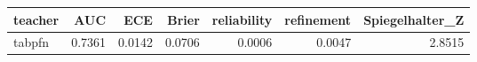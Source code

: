 \begin{tabular}{lrrrrrr}
\toprule
teacher & AUC & ECE & Brier & reliability & refinement & Spiegelhalter_Z \\
\midrule
tabpfn & 0.7361 & 0.0142 & 0.0706 & 0.0006 & 0.0047 & 2.8515 \\
\bottomrule
\end{tabular}
